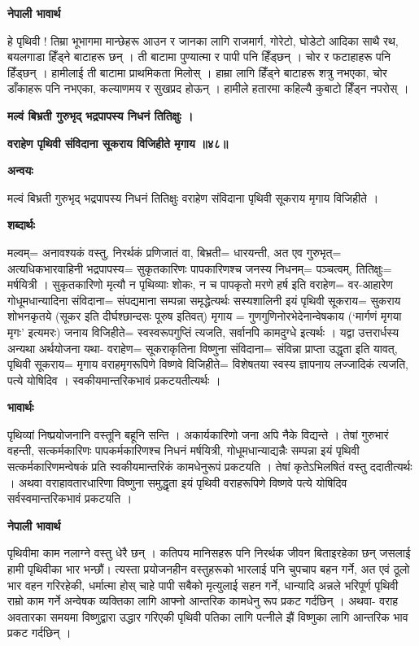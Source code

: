 \documentclass[11pt, a5paper]{article}
\begin{document}
\textbf{नेपाली भावार्थ}

हे पृथिवी ! तिम्रा भूभागमा  मान्छेहरू आउन र जानका लागि राजमार्ग, गोरेटो, घोडेटो आदिका साथै रथ, बयलगाडा हिँड्ने बाटाहरू छन् । ती बाटामा पुण्यात्मा र पापी पनि हिँड्छन् । चोर र फटाहाहरू पनि हिँड्छन् । हामीलाई ती बाटामा प्राथमिकता मिलोस् । हाम्रा लागि हिँड्ने बाटाहरू शत्रु नभएका, चोर डाँकाहरू पनि नभएका, कल्याणमय र सुखप्रद होऊन् । हामीले हतारमा कहिल्यै कुबाटो हिँड्न नपरोस् ।

\textbf{मल्वं बिभ्रती गुरुभृद् भद्रपापस्य निधनं तितिक्षुः ।}

\textbf{वराहेण पृथिवी संविदाना सूकराय विजिहीते मृगाय ॥४८॥}

\textbf{अन्वयः}

मल्वं बिभ्रती गुरुभृद् भद्रपापस्य निधनं तितिक्षुः वराहेण संविदाना पृथिवी सूकराय मृगाय विजिहीते ।

\textbf{शब्दार्थः}

मल्वम्= अनावश्यकं वस्तु, निरर्थकं प्रणिजातं वा, बिभ्रती= धारयन्ती, अत एव गुरुभृत्= अत्यधिकभारवाहिनी भद्रपापस्य= सुकृतकारिणः पापकारिणश्च जनस्य निधनम्= पञ्चत्वम्, तितिक्षुः= मर्षयित्री । सुकृतकारिणो मृत्यौ न पृथिव्याः शोकः, न च पापकृतो मरणे हर्ष इति वराहेण= वर-आहारेण गोधूमधान्यादिना संविदाना= संपद्यमाना सम्पन्ना समृद्धेत्यर्थः सस्यशालिनी इयं पृथिवी सूकराय= सुकराय शोभनकृतये (सूकर इति दीर्घश्छान्दसः पूरुष इतिवत्) मृगाय ‍‍‍= गुणगुणिनोरभेदेनान्वेषकाय (‘मार्गणं मृगया मृगः’ इत्यमरः) जनाय विजिहीते= स्वस्वरूपगुप्तिं त्यजति, सर्वानपि कामदुग्धे इत्यर्थः । यद्वा उत्तरार्धस्य अन्यथा अर्थयोजना यथा- वराहेण= सूकराकृतिना विष्णुना संविदाना= संविन्ना प्राप्ता उद्धृता इति यावत्, पृथिवी सूकराय= मृगाय वराहमृगरूपिणे विष्णवे विजिहीते= विशेषतया स्वस्य ज्ञापनाय लज्जादिकं त्यजति, पत्ये योषिदिव । स्वकीयमान्तरिकभावं प्रकटयतीत्यर्थः ।

\textbf{भावार्थः}

पृथिव्यां निष्प्रयोजनानि वस्तूनि बहूनि सन्ति । अकार्यकारिणो जना अपि नैके विद्यन्ते । तेषां गुरुभारं वहन्ती, सत्कर्मकारिणः पापकर्मकारिणश्च निधनं मर्षयित्री, गोधूमधान्याद्यन्नैः सम्पन्ना इयं पृथिवी सत्कर्मकारिणमन्वेषकं प्रति स्वकीयमान्तरिकं कामधेनुरूपं प्रकटयति । तेषां कृतेऽभिलषितं वस्तु ददातीत्यर्थः ।  अथवा वराहावतारधारिणा विष्णुना समुद्धृता इयं पृथिवी वराहरूपिणे विष्णवे पत्ये योषिदिव सर्वस्वमान्तरिकभावं प्रकटयति ।

\textbf{नेपाली भावार्थ}

पृथिवीमा काम नलाग्ने वस्तु धेरै छन् । कतिपय मानिसहरू पनि निरर्थक जीवन बिताइरहेका छन् जसलाई हामी पृथिवीका भार भन्छौं। त्यस्ता प्रयोजनहीन वस्तुहरूको भारलाई पनि चुपचाप बहन गर्ने, अत एवं ठूलो भार वहन गरिरहेकी, धर्मात्मा होस् चाहे पापी सबैको मृत्युलाई सहन गर्ने, धान्यादि अन्नले भरिपूर्ण पृथिवी राम्रो काम गर्ने अन्वेषक व्यक्तिका लागि आफ्नो आन्तरिक कामधेनु रूप प्रकट गर्दछिन् । अथवा- वराह अवतारका समयमा विष्णुद्वारा उद्धार गरिएकी पृथिवी पतिका लागि पत्नीले झैं विष्णुका लागि आन्तरिक भाव प्रकट गर्दछिन् ।
\end{document}
